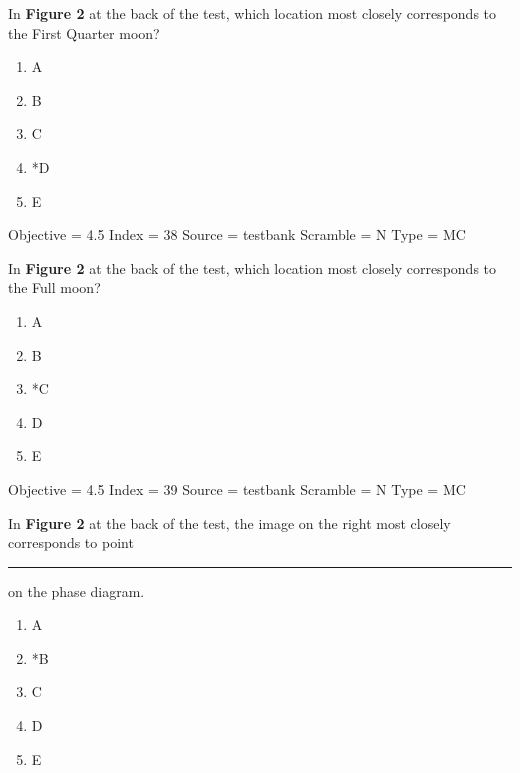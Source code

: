\documentclass[11pt]{article}
\begin{document}
\begin{enumerate}
\begin{minipage}{\textwidth}
\begin{minipage}{\textwidth}
\item In {\bf Figure 2} at the back of the test, which location most closely corresponds to the First Quarter moon?
\begin{multicols}{3}
\begin{enumerate} 
\setlength{\itemsep}{1pt} 
\setlength{\parskip}{0pt} 
\setlength{\parsep}{0pt}
\setlength{\multicolsep}{1pt} 
\item A
\item B
\item C
\item *D
\item E
\end{enumerate} 
\vfill 
\end{multicols}

Objective = 4.5
Index = 38
Source = testbank
Scramble = N
Type = MC
\end{minipage}
\end{minipage}
\vskip 0.20in

\begin{minipage}{\textwidth}
\begin{minipage}{\textwidth}
\item In {\bf Figure 2} at the back of the test, which location most closely corresponds to the Full moon?
\begin{multicols}{3}
\begin{enumerate} 
\setlength{\itemsep}{1pt} 
\setlength{\parskip}{0pt} 
\setlength{\parsep}{0pt}
\setlength{\multicolsep}{1pt} 
\item A
\item B
\item *C
\item D
\item E
\end{enumerate} 
\vfill 
\end{multicols}

Objective = 4.5
Index = 39
Source = testbank
Scramble = N
Type = MC
\end{minipage}
\end{minipage}
\vskip 0.20in

\begin{minipage}{\textwidth}
\begin{minipage}{\textwidth}
\item In {\bf Figure 2} at the back of the test, the image on the right most closely corresponds to point \rule{10mm}{0.4pt} on the phase diagram.
\begin{multicols}{3}
\begin{enumerate} 
\setlength{\itemsep}{1pt} 
\setlength{\parskip}{0pt} 
\setlength{\parsep}{0pt}
\setlength{\multicolsep}{1pt} 
\item A
\item *B
\item C
\item D
\item E
\end{enumerate} 
\vfill 
\end{multicols}


\end{minipage}
\end{minipage}
\end{enumerate}
\end{document}
